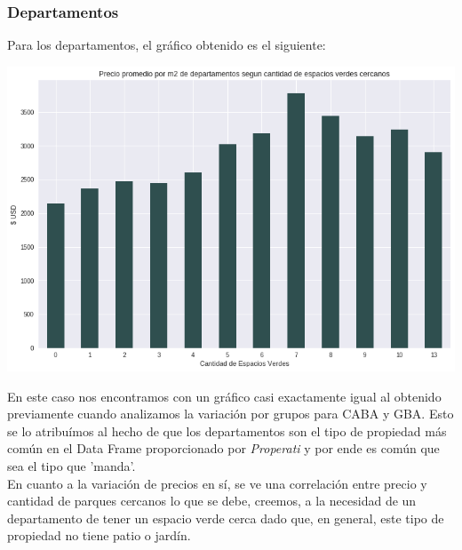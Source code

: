 \documentclass[a4paper, 10pt]{article}
\newcommand\tab[1][0.5cm]{\hspace*{#1}}
\begin{document}
			\subsubsection{Departamentos}
				Para los departamentos, el gráfico obtenido es el siguiente:
				\begin{center}
					\includegraphics[width=\textwidth]{images/parksImpactApartments}
				\end{center}
				\tab En este caso nos encontramos con un gráfico casi exactamente igual al obtenido previamente cuando analizamos
				la variación por grupos para CABA y GBA. Esto se lo atribuímos al hecho de que los departamentos son el tipo de 
				propiedad más común en el Data Frame proporcionado por \emph{Properati} y por ende es común que sea el tipo que
				'manda'. \\
				\tab En cuanto a la variación de precios en sí, se ve una correlación entre precio y cantidad de parques cercanos
				lo que se debe, creemos, a la necesidad de un departamento de tener un espacio verde cerca dado que, en general,
				este tipo de propiedad no tiene patio o jardín.
\end{document}
